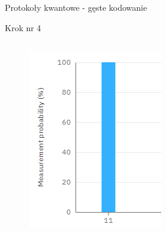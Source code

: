 \documentclass{beamer}
\begin{document}
\begin{frame}{Protokoły kwantowe - gęste kodowanie}
{\begin{block}{Krok nr 4}
\begin{columns}
				\begin{column}{0.34\textwidth}
					\begin{center}
						\begin{figure}
							\includegraphics[scale=0.33]{media/denseCodingPropability.png}
						\end{figure}
					\end{center}	
				\end{column}
			\end{columns}
			\vspace{0.5em}
		\end{block}
	}
	\end{frame}
	
\end{document}

